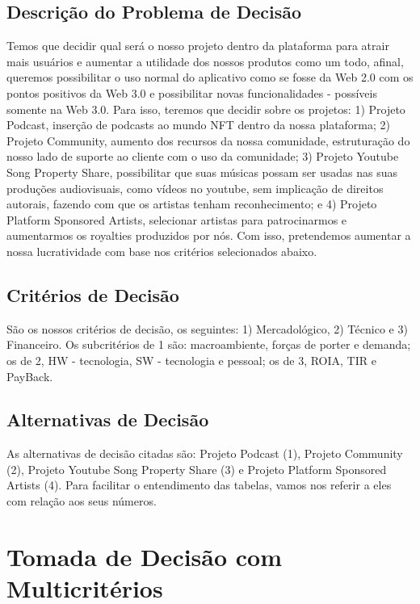 \documentclass[onecolumn,12pt]{asme2ej}
\begin{document}
\subsection{Descrição do Problema de Decisão}

Temos que decidir qual será o nosso projeto dentro da plataforma para atrair mais usuários e aumentar a utilidade dos nossos produtos como um todo, afinal, queremos possibilitar o uso normal do aplicativo como se fosse da Web 2.0 com os pontos positivos da Web 3.0 e possibilitar novas funcionalidades - possíveis somente na Web 3.0. Para isso, teremos que decidir sobre os projetos: 1) Projeto Podcast, inserção de podcasts ao mundo NFT dentro da nossa plataforma; 2) Projeto Community, aumento dos recursos da nossa comunidade, estruturação do nosso lado de suporte ao cliente com o uso da comunidade; 3) Projeto Youtube Song Property Share, possibilitar que suas músicas possam ser usadas nas suas produções audiovisuais, como vídeos no youtube, sem implicação de direitos autorais, fazendo com que os artistas tenham reconhecimento; e 4) Projeto Platform Sponsored Artists, selecionar artistas para patrocinarmos e aumentarmos os royalties produzidos por nós. Com isso, pretendemos aumentar a nossa lucratividade com base nos critérios selecionados abaixo.

\subsection{Critérios de Decisão}

São os nossos critérios de decisão, os seguintes: 1) Mercadológico, 2) Técnico e 3) Financeiro. Os subcritérios de 1 são: macroambiente, forças de porter e demanda; os de 2, HW - tecnologia, SW - tecnologia e pessoal; os de 3, ROIA, TIR e PayBack.

\subsection{Alternativas de Decisão}

As alternativas de decisão citadas são: Projeto Podcast (1), Projeto Community (2), Projeto Youtube Song Property Share (3) e Projeto Platform Sponsored Artists (4). Para facilitar o entendimento das tabelas, vamos nos referir a eles com relação aos seus números.

\section{Tomada de Decisão com Multicritérios}
\end{document}
